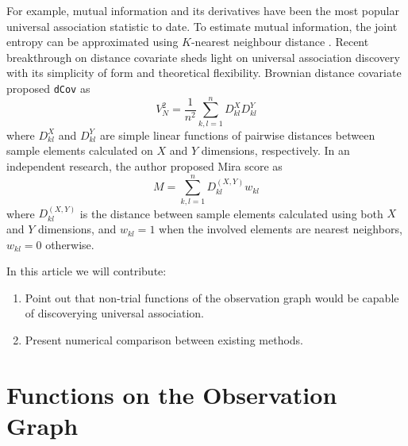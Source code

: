 \documentclass{sig-alternate}
\begin{document}
For example, mutual information and its derivatives have been the most
popular universal association statistic to date\cite{cite:my-cas-work,
  citation:MINE-science, tostevin2009mutual}. To estimate mutual
information, the joint entropy can be approximated using $K$-nearest
neighbour distance \cite{PhysRevE.69.066138, leonenko2008,
  doi:10.1080/104852504200026815}. Recent breakthrough on distance
covariate \cite{székely2009, székely2007} sheds light on universal
association discovery with its simplicity of form and theoretical
flexibility. Brownian distance \cite{székely2009} covariate proposed
\texttt{dCov} as
\begin{equation*}
  V_N^2 = \frac{1}{n^2}\sum_{k,l=1}^n D^{X}_{kl}D^{Y}_{kl}
\end{equation*}
where $D^{X}_{kl}$ and $D^{Y}_{kl}$ are simple linear functions of
pairwise distances between sample elements calculated on $X$ and $Y$
dimensions, respectively. In an independent research, the author
proposed Mira score \cite{my-dissertation} as 
\begin{equation*}
  M = \sum_{k,l = 1}^n D^{(X,Y)}_{kl} w_{kl}
\end{equation*}
where $D^{(X,Y)}_{kl}$ is the distance between sample elements
calculated using both $X$ and $Y$ dimensions, and $w_{kl}=1$ when the
involved elements are nearest neighbors, $w_{kl}=0$ otherwise.

In this article we will contribute: 
\begin{enumerate}
\item Point out that non-trial functions of the observation graph
  would be capable of discoverying universal association.
\item Present numerical comparison between existing methods.
\end{enumerate}

\section{Functions on the Observation Graph}
\label{sec:funcs}





\end{document}
